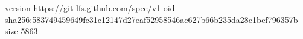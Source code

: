 version https://git-lfs.github.com/spec/v1
oid sha256:583749459649fc31c12147d27eaf52958546ac627b66b235da28c1bef796357b
size 5863
